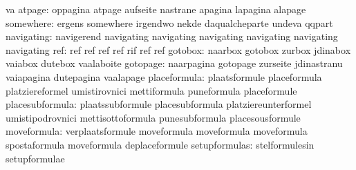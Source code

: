                                   va
                          atpage: oppagina                         atpage
                                  aufseite                         nastrane
                                  apagina                          lapagina
                                  alapage
                       somewhere: ergens                           somewhere
                                  irgendwo                         nekde
                                  daqualcheparte                   undeva
                                  qqpart
                      navigating: navigerend                       navigating
                                  navigating                       navigating
                                  navigating                       navigating
                                  navigating
                             ref: ref                              ref
                                  ref                              ref
                                  rif                              ref
                                  ref
                         gotobox: naarbox                          gotobox
                                  zurbox                           jdinabox
                                  vaiabox                          dutebox
                                  vaalaboite
                        gotopage: naarpagina                       gotopage
                                  zurseite                         jdinastranu
                                  vaiapagina                       dutepagina
                                  vaalapage
                    placeformula: plaatsformule                    placeformula
                                  platziereformel                  umistirovnici
                                  mettiformula                     puneformula
                                  placeformule
                 placesubformula: plaatssubformule                 placesubformula
                                  platziereunterformel             umistipodrovnici
                                  mettisottoformula                punesubformula
                                  placesousformule
                     moveformula: verplaatsformule                 moveformula
                                  moveformula                      moveformula
                                  spostaformula                    moveformula
                                  deplaceformule
                   setupformulas: stelformulesin                   setupformulae
